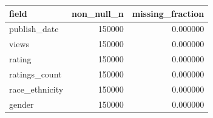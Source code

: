 \begin{tabular}{lrr}
\toprule
field & non_null_n & missing_fraction \\
\midrule
publish_date & 150000 & 0.000000 \\
views & 150000 & 0.000000 \\
rating & 150000 & 0.000000 \\
ratings_count & 150000 & 0.000000 \\
race_ethnicity & 150000 & 0.000000 \\
gender & 150000 & 0.000000 \\
\bottomrule
\end{tabular}
